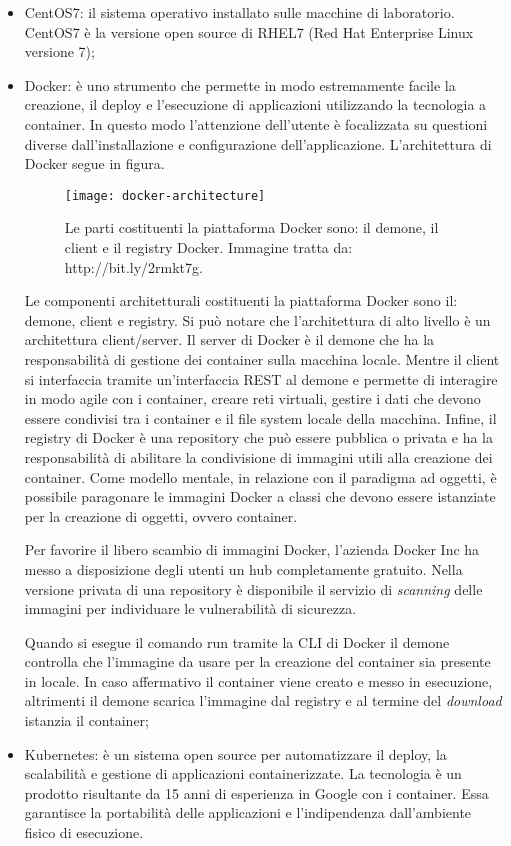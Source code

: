 \begin{itemize}
	\item CentOS7: il sistema operativo installato sulle macchine di laboratorio. CentOS7 è la versione open source di RHEL7 (Red Hat Enterprise Linux versione 7);
	\item Docker: è uno strumento che permette in modo estremamente facile la creazione, il deploy e l'esecuzione di applicazioni utilizzando la tecnologia a container. In questo modo l'attenzione dell'utente è focalizzata su questioni diverse dall'installazione e configurazione dell'applicazione. 
	L'architettura di Docker segue in figura. 
	
	\begin{figure}[htbp]
		\begin{center}
			\texttt{[image: docker-architecture]}
			\caption{Le parti costituenti la piattaforma Docker sono: il demone, il client e il registry Docker. Immagine tratta da: http://bit.ly/2rmkt7g.}
		\end{center}
	\end{figure}
	
	Le componenti architetturali costituenti la piattaforma Docker sono il:
	demone, client e registry. Si può notare che l'architettura di alto livello è 
	un architettura client/server. Il server di Docker è il demone che ha la responsabilità di gestione dei container sulla macchina locale. Mentre il client si interfaccia tramite un'interfaccia REST al demone e permette di interagire in modo agile con i container, creare reti virtuali, gestire i dati che devono essere condivisi tra i container e il file system locale della macchina. Infine, il registry di Docker è una repository che può essere pubblica o privata e ha la responsabilità di abilitare la condivisione di immagini utili alla creazione dei container. Come modello mentale, in relazione con il paradigma ad oggetti, è possibile paragonare le immagini Docker a classi che devono essere istanziate per la creazione di oggetti, ovvero container. 
	
	Per favorire il libero scambio di immagini Docker, l'azienda Docker Inc ha 
	messo a disposizione degli utenti un hub completamente gratuito. Nella versione privata di una repository è disponibile il servizio di \textit{scanning} delle immagini per individuare le vulnerabilità di sicurezza. 
	
	Quando si esegue il comando run tramite la CLI di Docker il demone controlla che l'immagine da usare per la creazione del container sia presente in locale. In caso affermativo il container viene creato e messo in esecuzione, altrimenti il demone scarica l'immagine dal registry e al termine del \textit{download} istanzia il container;
	\item Kubernetes: è un sistema open source per automatizzare il deploy, la scalabilità e gestione di applicazioni containerizzate. La tecnologia è un 
	prodotto risultante da 15 anni di esperienza in Google con i container. Essa garantisce la portabilità delle applicazioni e l'indipendenza dall'ambiente fisico di esecuzione.
	

\end{itemize}
